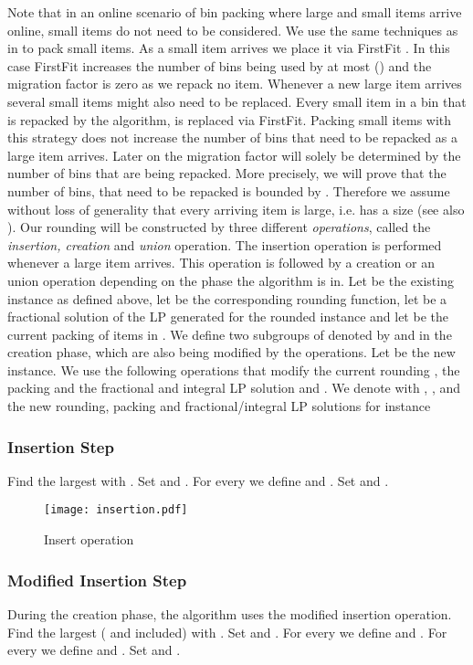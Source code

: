 \documentclass[a4paper,11pt]{article}
\begin{document}
Note that in an online scenario of bin packing  where large and small items arrive online, small items do not
need to be considered. We use the same techniques as in \cite{epstein2006robust} to pack small items. As a small item 
arrives we place it via FirstFit \cite{coffman1984approximation}. 
In this case FirstFit 
increases the number of bins being used by at most  (\cite{de1981bin}) and the migration factor is zero as we 
repack no item.
Whenever a new large item arrives several small items might also need to be replaced. Every small item in a bin
that is repacked by the algorithm, is replaced via FirstFit. Packing small items with this strategy 
does not increase the number of bins that need to
be repacked as a large item arrives. Later on the migration factor will solely be determined by the number of bins
that are being repacked. More precisely, we will prove that the number of bins, that need to be repacked is bounded
by .
Therefore we assume without loss of generality that every arriving item is large, i.e. has a size  
(see also \cite{epstein2006robust}).
Our rounding  will be constructed by three different \emph{operations},
called the \emph{insertion, creation} and \emph{union} operation. The
insertion operation is performed whenever a large item arrives. This
operation is followed by a creation or an union operation depending on the phase the algorithm is in. 
Let  be the existing instance as defined above, let  be the corresponding rounding function, let  
be a fractional solution of the LP generated for the rounded instance  and let  be the current packing
of items in . We define two subgroups of  denoted by  and  in the creation phase, 
which are also
being modified by the operations.
Let  be the new instance. We use the following operations that modify
the current rounding , the packing  and the fractional and integral LP solution  and .
We denote with , ,  and  the new rounding, packing and fractional/integral LP solutions for instance 
\subsubsection*{Insertion Step}
Find the largest  with . 
Set  and .
For every  we define  and .
Set  and .
\begin{figure}
\texttt{[image: insertion.pdf]}
\caption{Insert operation}
\end{figure}
\subsubsection*{Modified Insertion Step}
During the creation phase, the algorithm uses the modified insertion operation.
Find the largest  ( and  included) with . 
Set  and .
For every  we define  and .
For every  we define  and .
Set  and .
\end{document}
